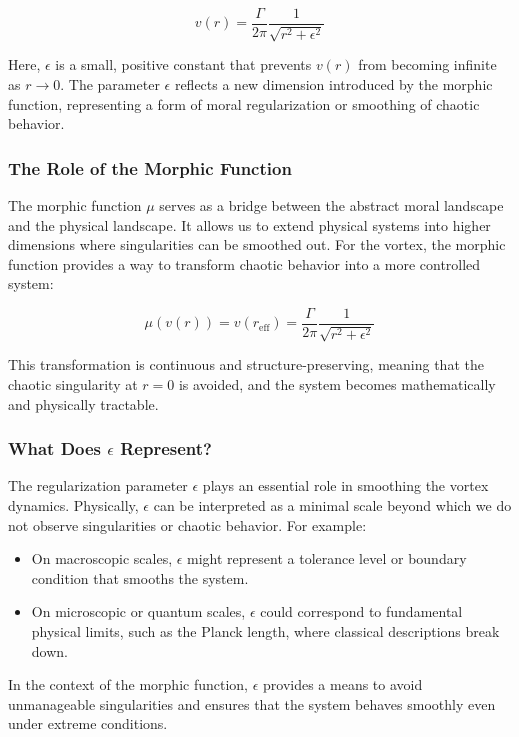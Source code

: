 \documentclass{article}
\begin{document}
\[
v(r) = \frac{\Gamma}{2\pi} \frac{1}{\sqrt{r^2 + \epsilon^2}}
\]

Here, \( \epsilon \) is a small, positive constant that prevents \( v(r) \) from becoming infinite as \( r \to 0 \). The parameter \( \epsilon \) reflects a new dimension introduced by the morphic function, representing a form of moral regularization or smoothing of chaotic behavior.

\subsubsection{The Role of the Morphic Function}

The morphic function \( \mu \) serves as a bridge between the abstract moral landscape and the physical landscape. It allows us to extend physical systems into higher dimensions where singularities can be smoothed out. For the vortex, the morphic function provides a way to transform chaotic behavior into a more controlled system:

\[
\mu(v(r)) = v(r_{\text{eff}}) = \frac{\Gamma}{2\pi} \frac{1}{\sqrt{r^2 + \epsilon^2}}
\]

This transformation is continuous and structure-preserving, meaning that the chaotic singularity at \( r = 0 \) is avoided, and the system becomes mathematically and physically tractable.

\subsubsection{What Does \( \epsilon \) Represent?}

The regularization parameter \( \epsilon \) plays an essential role in smoothing the vortex dynamics. Physically, \( \epsilon \) can be interpreted as a minimal scale beyond which we do not observe singularities or chaotic behavior. For example:
\begin{itemize}
    \item On macroscopic scales, \( \epsilon \) might represent a tolerance level or boundary condition that smooths the system.
    \item On microscopic or quantum scales, \( \epsilon \) could correspond to fundamental physical limits, such as the Planck length, where classical descriptions break down.
\end{itemize}

In the context of the morphic function, \( \epsilon \) provides a means to avoid unmanageable singularities and ensures that the system behaves smoothly even under extreme conditions.
\end{document}
